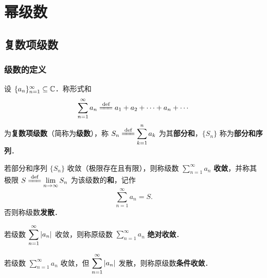 \documentclass[12pt, a4paper, oneside, UTF8]{ctexbook}
\begin{document}
%
\else
\fi
\chapter{幂级数}

\section{复数项级数}

\subsection{级数的定义}
\begin{definition}[复数项级数]
设 $\{a_n\}_{n=1}^{\infty}\subseteq\mathbb{C}$．称形式和
\[
\sum_{n=1}^{\infty} a_n \defeq a_1 + a_2 + \cdots + a_n + \cdots
\]
为\textbf{复数项级数}（简称为\textbf{级数}），称 $S_n \defeq \displaystyle\sum_{k=1}^{n} a_k$ 为其\textbf{部分和}，$\{S_n\}$ 称为\textbf{部分和序列}．
\end{definition}

\begin{definition}[级数的收敛与和]
若部分和序列 $\{S_n\}$ 收敛（极限存在且有限），则称级数 $\displaystyle\sum_{n=1}^{\infty} a_n$ \textbf{收敛}，并称其极限 $S \defeq \displaystyle\lim_{n\to\infty} S_n$ 为该级数的\textbf{和}，记作
\[
\sum_{n=1}^{\infty} a_n = S.
\]
否则称级数\textbf{发散}．
\end{definition}

\begin{definition}[绝对收敛与条件收敛]
若级数 $\displaystyle\sum_{n=1}^{\infty} \abs{a_n}$ 收敛，则称原级数 $\displaystyle\sum_{n=1}^{\infty} a_n$ \textbf{绝对收敛}．

若级数 $\displaystyle\sum_{n=1}^{\infty} a_n$ 收敛，但 $\displaystyle\sum_{n=1}^{\infty} \abs{a_n}$ 发散，则称原级数\textbf{条件收敛}．
\end{definition}
\end{document}
